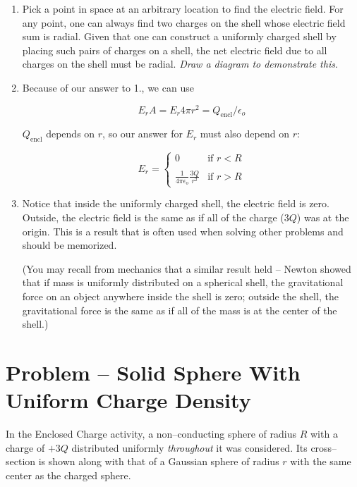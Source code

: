 \documentclass{article}
\newcommand{\ds}[0]{\displaystyle}
\begin{document}
\begin{enumerate}

  \item Pick a point in space at an arbitrary location to find the electric field. For any point, one can always find two charges on the shell whose electric field sum is radial. Given that one can construct a uniformly charged shell by placing such pairs of charges on a shell, the net electric field due to all charges on the shell must be radial. \emph{Draw a diagram to demonstrate this}.

  \item Because of our answer to 1., we can use

        $$E_rA = E_r 4\pi r^2 = {Q_{\text{encl}}}/{\epsilon_o}$$

        $Q_{\text{encl}}$ depends on $r$, so our answer for $E_r$ must also depend on $r$:

        $$
        E_r = \begin{cases}
          0   &\text{if } r < R \\\\
          \ds\frac{1}{4\pi\epsilon_o}\frac{3Q}{r^2} &\text{if } r > R
        \end{cases}
        $$

  \item 

        

        Notice that inside the uniformly charged shell, the electric field is zero. Outside, the electric field is the same as if all of the charge ($3Q$) was at the origin. This is a result that is often used when solving other problems and should be memorized.

        (You may recall from mechanics that a similar result held -- Newton showed that if mass is uniformly distributed on a spherical shell, the gravitational force on an object anywhere inside the shell is zero; outside the shell, the gravitational force is the same as if all of the mass is at the center of the shell.)

\end{enumerate}

\newpage

\section{Problem -- Solid Sphere With Uniform Charge Density}

In the Enclosed Charge activity, a non--conducting sphere of radius $R$ with a charge of $+3Q$ distributed uniformly \emph{throughout} it was considered. Its cross--section is shown along with that of a Gaussian sphere of radius $r$ with the same center as the charged sphere.
\end{document}
